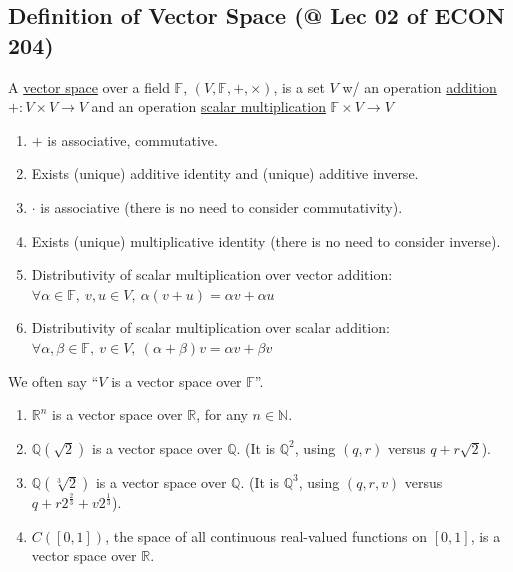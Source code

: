 \documentclass[11pt]{elegantbook}
\begin{document}
\subsection{Definition of Vector Space \small{(@ Lec 02 of ECON 204)}}
\begin{definition}
    \normalfont
    A \underline{vector space} over a field $\mathbb{F}$, $(V, \mathbb{F}, +,\times)$, is a set $V$ w/ an operation \underline{addition} $+ : V \times V \rightarrow V$ and an operation \underline{scalar multiplication} $\mathbb{F} \times V \rightarrow V$
    \begin{enumerate}
        \item $+$ is associative, commutative.
        \item Exists (unique) additive identity and (unique) additive inverse.
        \item $\cdot$ is associative (there is no need to consider commutativity).
        \item Exists (unique) multiplicative identity (there is no need to consider inverse).
        \item Distributivity of scalar multiplication over vector addition: $\forall \alpha\in\mathbb{F},\ v,u\in V,\ \alpha(v+u)=\alpha v+\alpha u$
        \item Distributivity of scalar multiplication over scalar addition: $\forall \alpha,\beta\in\mathbb{F},\ v\in V,\ (\alpha+\beta)v=\alpha v+\beta v$
    \end{enumerate}
\end{definition}
We often say “$V$ is a vector space over $\mathbb{F}$”.

\begin{example}
    \begin{enumerate}
        \item $\mathbb{R}^n$ is a vector space over $\mathbb{R}$, for any $n\in \mathbb{N}$.
        \item $\mathbb{Q}(\sqrt{2})$ is a vector space over $\mathbb{Q}$. (It is $\mathbb{Q}^2$, using $(q,r)$ versus $q+r\sqrt{2}$).
        \item $\mathbb{Q}(\sqrt[3]{2})$ is a vector space over $\mathbb{Q}$. (It is $\mathbb{Q}^3$, using $(q,r,v)$ versus $q+r 2^\frac{2}{3}+v2^\frac{1}{3}$).
        \item $C([0,1])$, the space of all continuous real-valued functions on $[0,1]$, is a vector space over $\mathbb{R}$.
    \end{enumerate}
\end{example}
\end{document}

